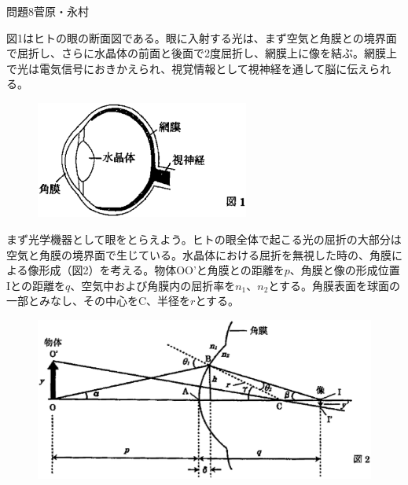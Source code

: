 \documentclass[fleqn]{jbook}
\begin{document}
\begin{question}{問題8}{菅原・永村}

図1はヒトの眼の断面図である。眼に入射する光は、まず空気と角膜との境界面で屈折し、さらに水晶体の前面と後面で2度屈折し、網膜上に像を結ぶ。網膜上で光は電気信号におきかえられ、視覚情報として視神経を通して脳に伝えられる。

\begin{figure}[htbp]
\begin{center}
\includegraphics[width=70mm]{2003phy8-1.eps}
\end{center}
\end{figure}

まず光学機器として眼をとらえよう。ヒトの眼全体で起こる光の屈折の大部分は空気と角膜の境界面で生じている。水晶体における屈折を無視した時の、角膜による像形成（図2）を考える。物体OO'と角膜との距離を$p$、角膜と像の形成位置Iとの距離を$q$、空気中および角膜内の屈折率を$n_1$、$n_2$とする。角膜表面を球面の一部とみなし、その中心をC、半径を$r$とする。

\begin{figure}[htbp]
\begin{center}
\includegraphics[width=140mm]{2003phy8-2.eps}
\end{center}
\end{figure}


\end{question}
\end{document}
